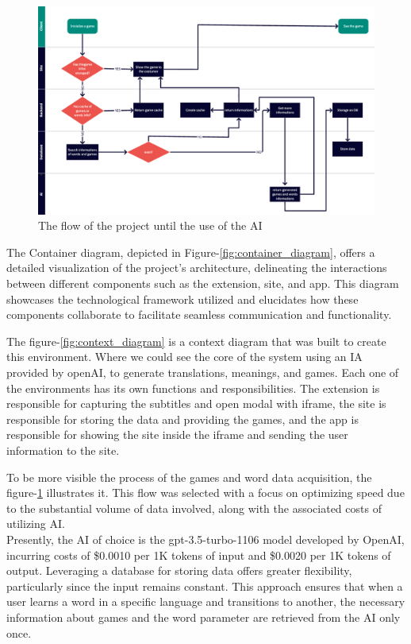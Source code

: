 \documentclass[12pt]{article}
\begin{document}
\begin{figure}[htbp]
  \centering
  \caption{
    The flow of the project until the use of the AI
  }
  \label{fig:flow_diagram}
  \includegraphics[width=1\textwidth]{assets/26.png}
\end{figure}

The Container diagram, depicted in Figure-\ref{fig:container_diagram}, offers a detailed visualization of the project's architecture, delineating the interactions between different components such as the extension, site, and app. This diagram showcases the technological framework utilized and elucidates how these components collaborate to facilitate seamless communication and functionality. 


The figure-\ref{fig:context_diagram} is a context diagram that was built to create this environment. Where we could see the core of the system using an IA provided by openAI, to generate translations, meanings, and games. Each one of the environments has its own functions and responsibilities. The extension is responsible for capturing the subtitles and open modal with iframe, the site is responsible for storing the data and providing the games, and the app is responsible for showing the site inside the iframe and sending the user information to the site.

To be more visible the process of the games and word data acquisition, the figure-\ref{fig:flow_diagram} illustrates it. This flow was selected with a focus on optimizing speed due to the substantial volume of data involved, along with the associated costs of utilizing AI. \\
Presently, the AI of choice is the gpt-3.5-turbo-1106 model developed by OpenAI, incurring costs of \$0.0010 per 1K tokens of input and \$0.0020 per 1K tokens of output. Leveraging a database for storing data offers greater flexibility, particularly since the input remains constant. This approach ensures that when a user learns a word in a specific language and transitions to another, the necessary information about games and the word parameter are retrieved from the AI only once. 
\end{document}
